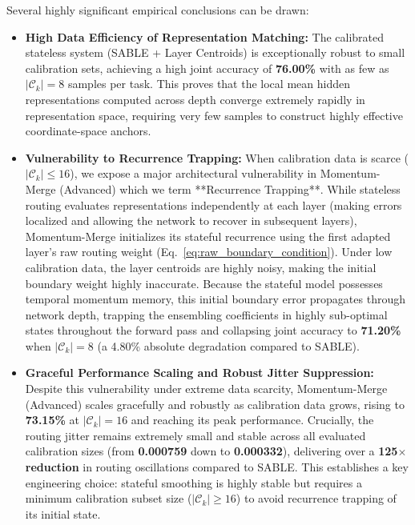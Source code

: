 \documentclass{article}
\theoremstyle{plain}
\theoremstyle{definition}
\theoremstyle{remark}
\begin{document}
    Several highly significant empirical conclusions can be drawn:
    \begin{itemize}
        \item \textbf{High Data Efficiency of Representation Matching:} The calibrated stateless system (SABLE + Layer Centroids) is exceptionally robust to small calibration sets, achieving a high joint accuracy of \textbf{76.00\%} with as few as $|\mathcal{C}_k| = 8$ samples per task. This proves that the local mean hidden representations computed across depth converge extremely rapidly in representation space, requiring very few samples to construct highly effective coordinate-space anchors.
        \item \textbf{Vulnerability to Recurrence Trapping:} When calibration data is scarce ($|\mathcal{C}_k| \le 16$), we expose a major architectural vulnerability in Momentum-Merge (Advanced) which we term **Recurrence Trapping**. While stateless routing evaluates representations independently at each layer (making errors localized and allowing the network to recover in subsequent layers), Momentum-Merge initializes its stateful recurrence using the first adapted layer's raw routing weight (Eq.~\ref{eq:raw_boundary_condition}). Under low calibration data, the layer centroids are highly noisy, making the initial boundary weight highly inaccurate. Because the stateful model possesses temporal momentum memory, this initial boundary error propagates through network depth, trapping the ensembling coefficients in highly sub-optimal states throughout the forward pass and collapsing joint accuracy to \textbf{71.20\%} when $|\mathcal{C}_k| = 8$ (a 4.80\% absolute degradation compared to SABLE).
        \item \textbf{Graceful Performance Scaling and Robust Jitter Suppression:} Despite this vulnerability under extreme data scarcity, Momentum-Merge (Advanced) scales gracefully and robustly as calibration data grows, rising to \textbf{73.15\%} at $|\mathcal{C}_k| = 16$ and reaching its peak performance. Crucially, the routing jitter remains extremely small and stable across all evaluated calibration sizes (from \textbf{0.000759} down to \textbf{0.000332}), delivering over a \textbf{125$\times$ reduction} in routing oscillations compared to SABLE. This establishes a key engineering choice: stateful smoothing is highly stable but requires a minimum calibration subset size ($|\mathcal{C}_k| \ge 16$) to avoid recurrence trapping of its initial state.
    \end{itemize}
\end{document}
